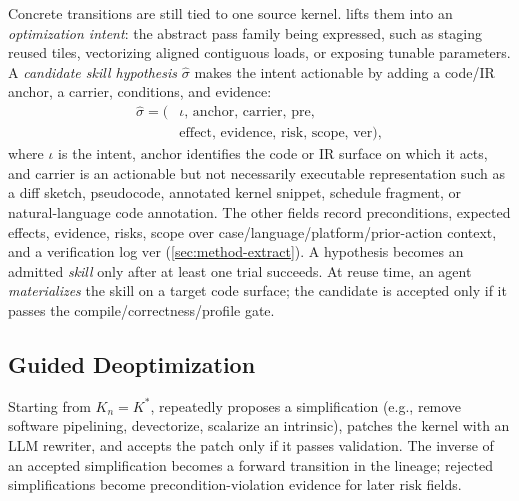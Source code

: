 Concrete transitions are still tied to one source kernel. \sys lifts them into an \emph{optimization intent}: the abstract pass family being expressed, such as staging reused tiles, vectorizing aligned contiguous loads, or exposing tunable parameters. A \emph{candidate skill hypothesis} $\hat{\sigma}$ makes the intent actionable by adding a code/IR anchor, a carrier, conditions, and evidence:
\[
\begin{aligned}
\hat{\sigma} = \big(&\iota,\, \mathrm{anchor},\, \mathrm{carrier},\, \mathrm{pre},\\
                   &\mathrm{effect},\, \mathrm{evidence},\, \mathrm{risk},\,
                    \mathrm{scope},\, \mathrm{ver}\big),
\end{aligned}
\]
where $\iota$ is the intent, $\mathrm{anchor}$ identifies the code or IR surface on which it acts, and $\mathrm{carrier}$ is an actionable but not necessarily executable representation such as a diff sketch, pseudocode, annotated kernel snippet, schedule fragment, or natural-language code annotation. The other fields record preconditions, expected effects, evidence, risks, scope over case/language/platform/prior-action context, and a verification log $\mathrm{ver}$ (\autoref{sec:method-extract}). A hypothesis becomes an admitted \emph{skill} only after at least one trial succeeds.
At reuse time, an agent \emph{materializes} the skill on a target code surface; the candidate is accepted only if it passes the compile/correctness/profile gate.

\subsection{Guided Deoptimization}
\label{sec:method-deopt}

Starting from $K_n = K^*$, \sys repeatedly proposes a simplification (e.g., remove software pipelining, devectorize, scalarize an intrinsic), patches the kernel with an LLM rewriter, and accepts the patch only if it passes validation. The inverse of an accepted simplification becomes a forward transition in the lineage; rejected simplifications become precondition-violation evidence for later $\mathrm{risk}$ fields.

